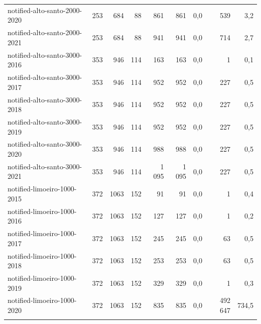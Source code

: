 \documentclass[a4paper,11pt]{article}
\begin{document}
\begin{table}[!ht]
{\begin{tabular}{lrrrrrrrr}
\rowcolor[HTML]{9B9B9B} 
notified-alto-santo-2000-2020 & 253  & 684  & 88  & 861    & 861    & 0,0  & 539     & 3,2                         \\
\rowcolor[HTML]{9B9B9B} 
notified-alto-santo-2000-2021 & 253  & 684  & 88  & 941    & 941    & 0,0  & 714     & 2,7                         \\ \hline
\rowcolor[HTML]{9B9B9B} 
notified-alto-santo-3000-2016 & 353  & 946  & 114 & 163    & 163    & 0,0  & 1       & 0,1                         \\
\rowcolor[HTML]{9B9B9B} 
notified-alto-santo-3000-2017 & 353  & 946  & 114 & 952    & 952    & 0,0  & 227     & 0,5                         \\
\rowcolor[HTML]{9B9B9B} 
notified-alto-santo-3000-2018 & 353  & 946  & 114 & 952    & 952    & 0,0  & 227     & 0,5                         \\
\rowcolor[HTML]{9B9B9B} 
notified-alto-santo-3000-2019 & 353  & 946  & 114 & 952    & 952    & 0,0  & 227     & 0,5                         \\
\rowcolor[HTML]{9B9B9B} 
notified-alto-santo-3000-2020 & 353  & 946  & 114 & 988    & 988    & 0,0  & 227     & 0,5                         \\
\rowcolor[HTML]{9B9B9B} 
notified-alto-santo-3000-2021 & 353  & 946  & 114 & 1 095  & 1 095  & 0,0  & 227     & 0,5                         \\ \hline
\rowcolor[HTML]{9B9B9B} 
notified-limoeiro-1000-2015   & 372  & 1063 & 152 & 91     & 91     & 0,0  & 1       & 0,4                         \\
\rowcolor[HTML]{9B9B9B} 
notified-limoeiro-1000-2016   & 372  & 1063 & 152 & 127    & 127    & 0,0  & 1       & 0,2                         \\
\rowcolor[HTML]{9B9B9B} 
notified-limoeiro-1000-2017   & 372  & 1063 & 152 & 245    & 245    & 0,0  & 63      & 0,5                         \\
\rowcolor[HTML]{9B9B9B} 
notified-limoeiro-1000-2018   & 372  & 1063 & 152 & 253    & 253    & 0,0  & 63      & 0,5                         \\
\rowcolor[HTML]{9B9B9B} 
notified-limoeiro-1000-2019   & 372  & 1063 & 152 & 329    & 329    & 0,0  & 1       & 0,3                         \\
\rowcolor[HTML]{9B9B9B} 
notified-limoeiro-1000-2020   & 372  & 1063 & 152 & 835    & 835    & 0,0  & 492 647 & 734,5                       \\
\rowcolor[HTML]{9B9B9B} 

\end{tabular}}
\end{table}
\end{document}
